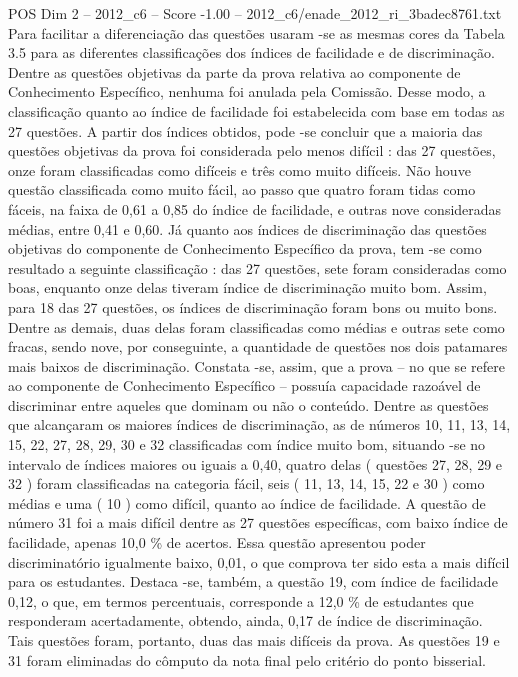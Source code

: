 \begin{textsample}{POS Dim 2 – 2012\_c6 – Score -1.00 – 2012\_c6/enade\_2012\_ri\_3badec8761.txt}
Para facilitar a diferenciação das questões usaram -se as mesmas cores da Tabela 3.5 para as diferentes classificações dos índices de facilidade e de discriminação.
Dentre as questões objetivas da parte da prova relativa ao componente de Conhecimento Específico, nenhuma foi anulada pela Comissão.
Desse modo, a classificação quanto ao índice de facilidade foi estabelecida com base em todas as 27 questões.
A partir dos índices obtidos, pode -se concluir que a maioria das questões objetivas da prova foi considerada pelo menos difícil : das 27 questões, onze foram classificadas como difíceis e três como muito difíceis.
Não houve questão classificada como muito fácil, ao passo que quatro foram tidas como fáceis, na faixa de 0,61 a 0,85 do índice de facilidade, e outras nove consideradas médias, entre 0,41 e 0,60.
Já quanto aos índices de discriminação das questões objetivas do componente de Conhecimento Específico da prova, tem -se como resultado a seguinte classificação : das 27 questões, sete foram consideradas como boas, enquanto onze delas tiveram índice de discriminação muito bom.
Assim, para 18 das 27 questões, os índices de discriminação foram bons ou muito bons.
Dentre as demais, duas delas foram classificadas como médias e outras sete como fracas, sendo nove, por conseguinte, a quantidade de questões nos dois patamares mais baixos de discriminação.
Constata -se, assim, que a prova – no que se refere ao componente de Conhecimento Específico – possuía capacidade razoável de discriminar entre aqueles que dominam ou não o conteúdo.
Dentre as questões que alcançaram os maiores índices de discriminação, as de números 10, 11, 13, 14, 15, 22, 27, 28, 29, 30 e 32 classificadas com índice muito bom, situando -se no intervalo de índices maiores ou iguais a 0,40, quatro delas ( questões 27, 28, 29 e 32 ) foram classificadas na categoria fácil, seis ( 11, 13, 14, 15, 22 e 30 ) como médias e uma ( 10 ) como difícil, quanto ao índice de facilidade.
A questão de número 31 foi a mais difícil dentre as 27 questões específicas, com baixo índice de facilidade, apenas 10,0 \% de acertos.
Essa questão apresentou poder discriminatório igualmente baixo, 0,01, o que comprova ter sido esta a mais difícil para os estudantes.
Destaca -se, também, a questão 19, com índice de facilidade 0,12, o que, em termos percentuais, corresponde a 12,0 \% de estudantes que responderam acertadamente, obtendo, ainda, 0,17 de índice de discriminação.
Tais questões foram, portanto, duas das mais difíceis da prova.
As questões 19 e 31 foram eliminadas do cômputo da nota final pelo critério do ponto bisserial.

\end{textsample}
